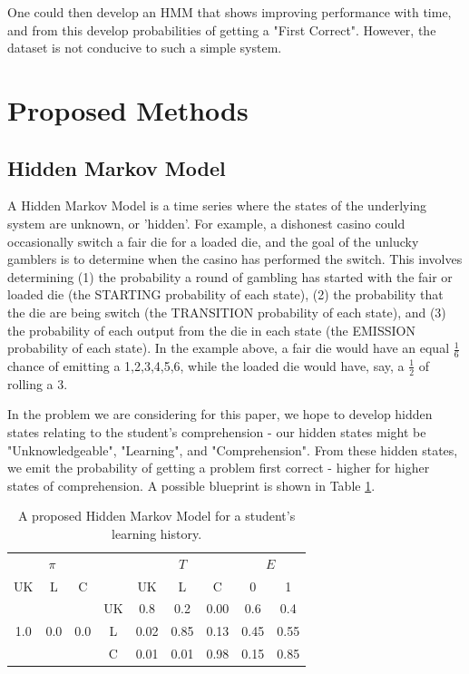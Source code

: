 \documentclass{article} %
\begin{document}
One could then develop an HMM that shows improving performance with time, and from this develop probabilities of getting a "First Correct". However, the dataset is not conducive to such a simple system.

\section{Proposed Methods}

\subsection{Hidden Markov Model}

A Hidden Markov Model is a time series where the states of the underlying system are unknown, or 'hidden'. For example, a dishonest casino could occasionally switch a fair die for a loaded die, and the goal of the unlucky gamblers is to determine when the casino has performed the switch. This involves determining (1) the probability a round of gambling has started with the fair or loaded die (the STARTING probability of each state), (2) the probability that the die are being switch (the TRANSITION probability of each state), and (3) the probability of each output from the die in each state (the EMISSION probability of each state). In the example above, a fair die would have an equal $\frac{1}{6}$ chance of emitting a 1,2,3,4,5,6, while the loaded die would have, say, a $\frac{1}{2}$ of rolling a 3.

In the problem we are considering for this paper, we hope to develop hidden states relating to the student's comprehension - our hidden states might be "Unknowledgeable", "Learning", and "Comprehension". From these hidden states, we emit the probability of getting a problem first correct - higher for higher states of comprehension. A possible blueprint is shown in Table \ref{HMMprop}.

\begin{table}[t]
\begin{center}
\begin{tabular}{ccc|c|ccc|cc}
\multicolumn{3}{c}{$\pi$} && \multicolumn{3}{c}{$T$} & \multicolumn{2}{c}{$E$}\\
UK & L & C & & UK & L & C & 0 & 1\\
& & & UK &0.8 & 0.2 & 0.00  & 0.6 & 0.4\\
1.0 & 0.0 & 0.0 & L & 0.02 & 0.85 & 0.13 & 0.45 & 0.55\\
&&& C & 0.01 & 0.01 & 0.98 & 0.15 & 0.85\\

\end{tabular}
\caption{A proposed Hidden Markov Model for a student's learning history.}\label{HMMprop}
\end{center}
\end{table}
\end{document}
